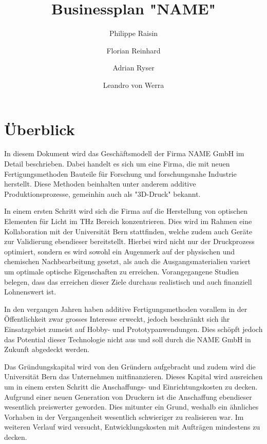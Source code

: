 \documentclass[12pt]{article}
\begin{document}
\title{Businessplan "NAME"}
\author{Philippe Raisin \and
        Florian Reinhard \and
        Adrian Ryser \and
        Leandro von Werra}
\maketitle
\tableofcontents
\newpage



\section{Überblick}
In diesem Dokument wird das Geschäftsmodell der Firma NAME GmbH im Detail beschrieben. Dabei handelt es sich um eine Firma, die mit neuen Fertigungsmethoden Bauteile für Forschung und forschungsnahe Industrie herstellt. Diese Methoden beinhalten unter anderem additive Produktionsprozesse, gemeinhin auch als "3D-Druck" bekannt. 

In einem ersten Schritt wird sich die Firma auf die Herstellung von optischen Elementen für Licht im THz Bereich konzentrieren. Dies wird im Rahmen eine Kollaboration mit der Universität Bern stattfinden, welche zudem auch Geräte zur Validierung ebendieser bereitstellt. Hierbei wird nicht nur der Druckprozess optimiert, sondern es wird sowohl ein Augenmerk auf der physischen und chemischen Nachbearbeitung gesetzt, als auch die Ausgangsmaterialien variert um optimale optische Eigenschaften zu erreichen. Vorangegangene Studien belegen, dass das erreichen dieser Ziele durchaus realistisch und auch finanziell Lohnenswert ist.

In den vergangen Jahren haben additive Fertigungsmethoden vorallem in der Öffentlichkeit zwar grosses Interesse erweckt, jedoch beschränkt sich ihr Einsatzgebiet zumeist auf Hobby- und Prototypanwendungen. Dies schöpft jedoch das Potential dieser Technologie nicht aus und soll durch die NAME GmbH in Zukunft abgedeckt werden.

Das Gründungskapital wird von den Gründern aufgebracht und zudem wird die Universität Bern das Unternehmen mitfinanzieren. Dieses Kapital wird ausreichen um in einem ersten Schritt die Anschaffungs- und Einrichtungskosten zu decken. Aufgrund einer neuen Generation von Druckern ist die Anschaffung ebendieser wesentlich preiswerter geworden. Dies mitunter ein Grund, weshalb ein ähnliches Vorhaben in der Vergangenheit wesentlich schwieriger zu realisieren war. Im weiteren Verlauf wird versucht, Entwicklungskosten mit Aufträgen mindestens zu decken.
\end{document}
